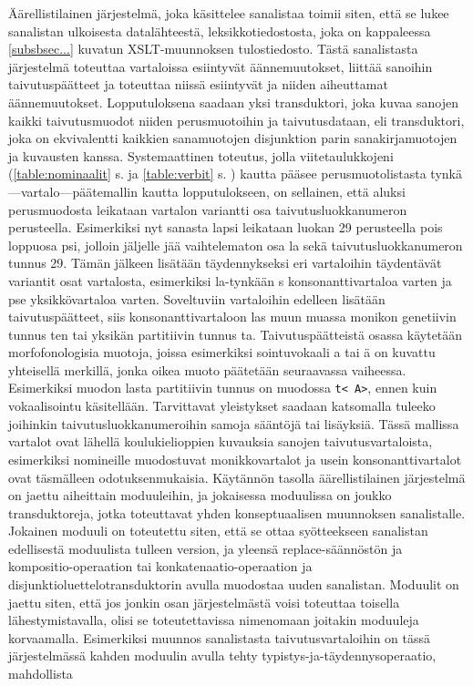 \documentclass[free]{flammie}
\begin{document}
Äärellistilainen järjestelmä, joka käsittelee sanalistaa toimii siten, että se lukee
sanalistan ulkoisesta datalähteestä, leksikkotiedostosta, joka on kappaleessa
\ref{subsbsec...}
kuvatun XSLT-muunnoksen tulostiedosto. Tästä sanalistasta järjestelmä toteuttaa
vartaloissa esiintyvät äännemuutokset, liittää sanoihin taivutuspäätteet ja toteuttaa
niissä esiintyvät ja niiden aiheuttamat äännemuutokset. Lopputuloksena saadaan
yksi transduktori, joka kuvaa sanojen kaikki taivutusmuodot niiden perusmuotoihin ja taivutusdataan, eli transduktori, joka on ekvivalentti kaikkien sanamuotojen
disjunktion parin sanakirjamuotojen ja kuvausten kanssa.
Systemaattinen toteutus, jolla viitetaulukkojeni (\ref{table:nominaalit} s.
\pageref{table:nominaalit} ja \ref{table:verbit} s. \pageref{table:verbit}) kautta pääsee
perusmuotolistasta tynkä—vartalo—päätemallin kautta lopputulokseen, on sellainen, että aluksi perusmuodosta leikataan vartalon variantti osa taivutusluokkanumeron perusteella. Esimerkiksi nyt sanasta lapsi leikataan luokan 29 perusteella
pois loppuosa psi, jolloin jäljelle jää vaihtelematon osa la sekä taivutusluokkanumeron tunnus 29. Tämän jälkeen lisätään täydennykseksi eri vartaloihin täydentävät variantit osat vartalosta, esimerkiksi la-tynkään s konsonanttivartaloa varten ja
pse yksikkövartaloa varten. Soveltuviin vartaloihin edelleen lisätään taivutuspäätteet, siis konsonanttivartaloon las muun muassa monikon genetiivin tunnus ten tai
yksikän partitiivin tunnus ta. Taivutuspäätteistä osassa käytetään morfofonologisia muotoja, joissa esimerkiksi sointuvokaali a tai ä on kuvattu yhteisellä merkillä, jonka oikea muoto päätetään seuraavassa vaiheessa. Esimerkiksi muodon lasta
partitiivin tunnus on muodossa \texttt{t<~A>}, ennen kuin vokaalisointu käsitellään. Tarvittavat yleistykset saadaan katsomalla tuleeko joihinkin taivutusluokkanumeroihin samoja sääntöjä tai lisäyksiä. Tässä mallissa vartalot ovat lähellä koulukielioppien kuvauksia sanojen taivutusvartaloista, esimerkiksi nomineille muodostuvat
monikkovartalot ja usein konsonanttivartalot ovat täsmälleen odotuksenmukaisia.
Käytännön tasolla äärellistilainen järjestelmä on jaettu aiheittain moduuleihin, ja
jokaisessa moduulissa on joukko transduktoreja, jotka toteuttavat yhden konseptuaalisen muunnoksen sanalistalle. Jokainen moduuli on toteutettu siten, että se
ottaa syötteekseen sanalistan edellisestä moduulista tulleen version, ja yleensä
replace-säännöstön ja kompositio-operaation tai konkatenaatio-operaation ja disjunktioluettelotransduktorin avulla muodostaa uuden sanalistan.
Moduulit on jaettu siten, että jos jonkin osan järjestelmästä voisi toteuttaa toisella lähestymistavalla, olisi se toteutettavissa nimenomaan joitakin moduuleja korvaamalla. Esimerkiksi muunnos sanalistasta taivutusvartaloihin on tässä järjestelmässä kahden moduulin avulla tehty typistys-ja-täydennysoperaatio, mahdollista
\end{document}
